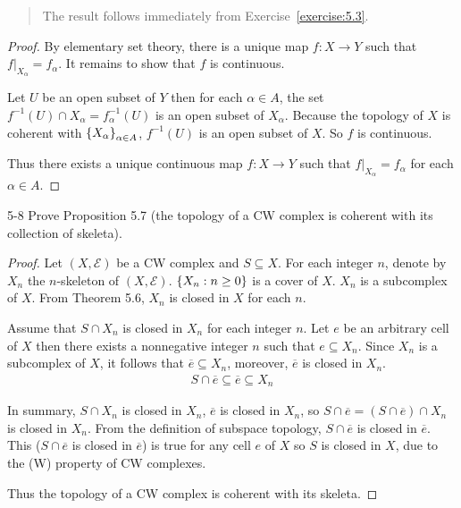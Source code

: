 \begin{quote}
	The result follows immediately from Exercise~\ref{exercise:5.3}.
\end{quote}

\begin{proof}
	By elementary set theory, there is a unique map \( f: X \to Y \) such that \( f\vert_{X_{\alpha}} = f_{\alpha} \). It remains to show that \( f \) is continuous.

	Let \( U \) be an open subset of \( Y \) then for each \( \alpha\in A \), the set \( f^{-1}(U) \cap X_{\alpha} = f_{\alpha}^{-1}(U) \) is an open subset of \( X_{\alpha} \). Because the topology of \( X \) is coherent with \( \left\{{X_{\alpha}}\right\}_{\alpha\in A} \), \( f^{-1}(U) \) is an open subset of \( X \). So \( f \) is continuous.

	Thus there exists a unique continuous map \( f: X\to Y \) such that \( f\vert_{X_{\alpha}} = f_{\alpha} \) for each \( \alpha\in A \).
\end{proof}

\begin{problem}{5-8}\label{problem:5-8}
Prove Proposition 5.7 (the topology of a CW complex is coherent with its
collection of skeleta).
\end{problem}

\begin{proof}
	Let \( (X, \mathscr{E}) \) be a CW complex and \( S \subseteq X \). For each integer \( n \), denote by \( X_{n} \) the \( n \)-skeleton of \( (X, \mathscr{E}) \). \( \left\{{ X_{n} : n\geq 0 }\right\} \) is a cover of \( X \). \( X_{n} \) is a subcomplex of \( X \). From Theorem 5.6, \( X_{n} \) is closed in \( X \) for each \( n \).

	Assume that \( S \cap X_{n} \) is closed in \( X_{n} \) for each integer \( n \). Let \( e \) be an arbitrary cell of \( X \) then there exists a nonnegative integer \( n \) such that \( e \subseteq X_{n} \). Since \( X_{n} \) is a subcomplex of \( X \), it follows that \( \overline{e} \subseteq X_{n} \), moreover, \( \overline{e} \) is closed in \( X_{n} \).
	\begin{align*}
		S \cap \overline{e} \subseteq \overline{e} \subseteq X_{n}
	\end{align*}

	In summary, \( S\cap X_{n} \) is closed in \( X_{n} \), \( \overline{e} \) is closed in \( X_{n} \), so \( S\cap \overline{e} = (S\cap \overline{e}) \cap X_{n} \) is closed in \( X_{n} \). From the definition of subspace topology, \( S \cap \overline{e} \) is closed in \( \overline{e} \). This (\( S\cap \overline{e} \) is closed in \( \overline{e} \)) is true for any cell \( e \) of \( X \) so \( S \) is closed in \( X \), due to the (W) property of CW complexes.

	Thus the topology of a CW complex is coherent with its skeleta.
\end{proof}

